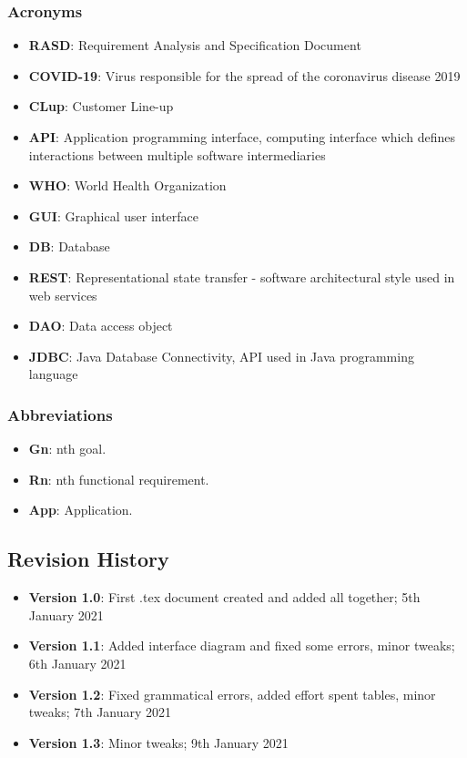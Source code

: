 \subsubsection{Acronyms}
\begin{itemize}
	\item \textbf{RASD}: Requirement Analysis and Specification Document
	\item \textbf{COVID-19}: Virus responsible for the spread of the coronavirus disease 2019
	\item \textbf{CLup}: Customer Line-up
	\item \textbf{API}: Application programming interface, computing interface which defines interactions between multiple software intermediaries 
	\item \textbf{WHO}: World Health Organization
	\item \textbf{GUI}: Graphical user interface
	\item \textbf{DB}: Database
	\item \textbf{REST}: Representational state transfer - software architectural style used in web services
	\item \textbf{DAO}: Data access object
	\item \textbf{JDBC}: Java Database Connectivity, API used in Java programming language
\end{itemize}
\subsubsection{Abbreviations}
\begin{itemize}
	\item \textbf{Gn}: nth goal.
	\item \textbf{Rn}: nth functional requirement.
	\item \textbf{App}: Application.
\end{itemize}

\newpage
\subsection{Revision History}
\begin{itemize}
	\item \textbf{Version 1.0}: First .tex document created and added all together; 5th January 2021
	\item \textbf{Version 1.1}: Added interface diagram and fixed some errors, minor tweaks; 6th January 2021
	\item \textbf{Version 1.2}: Fixed grammatical errors, added effort spent tables, minor tweaks; 7th January 2021
	\item \textbf{Version 1.3}: Minor tweaks; 9th January 2021
\end{itemize}

